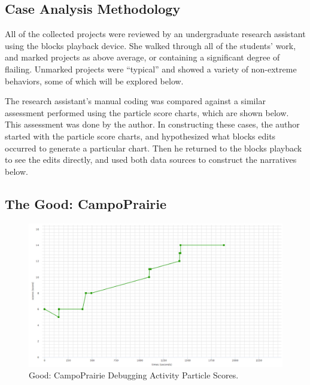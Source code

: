 \subsection{Case Analysis Methodology}
All of the collected projects were reviewed by an undergraduate research assistant using the blocks playback device. She walked through all of the students' work, and marked projects as above average, or containing a significant degree of flailing. Unmarked projects were ``typical'' and showed a variety of non-extreme behaviors, some of which will be explored below.

The research assistant's manual coding was compared against a similar assessment performed using the particle score charts, which are shown below. This assessment was done by the author. In constructing these cases, the author started with the particle score charts, and hypothesized what blocks edits occurred to generate a particular chart. Then he returned to the blocks playback to see the edits directly, and used both data sources to construct the narratives below.

\subsection{The Good: CampoPrairie}
\begin{figure}
	\centering
	\includegraphics[width=\textwidth]{images/stories/scores-debug-CampoPrairie}
	\caption[Good: CampoPrairie Debugging Activity Particle Scores]{Good: CampoPrairie Debugging Activity Particle Scores.}
	\label{fig:CampoPrairie_chart}
\end{figure}

